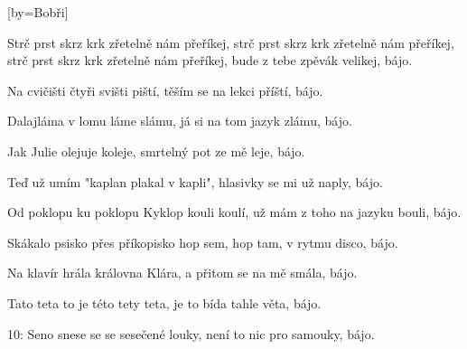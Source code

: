 [by={Bobři}]

\beginchorus{}
Strč prst skrz krk zřetelně nám přeříkej,
strč prst skrz krk zřetelně nám přeříkej,
strč prst skrz krk zřetelně nám přeříkej,
bude z tebe zpěvák velikej, bájo.
\endchorus{}

\beginverse{}
Na cvičišti čtyři svišti piští,
těším se na lekci příští, bájo.
\endverse{}

\beginverse{}
Dalajláma v lomu láme slámu,
já si na tom jazyk zlámu, bájo.
\endverse{}

\beginverse{}
Jak Julie olejuje koleje,
smrtelný pot ze mě leje, bájo.
\endverse{}

\beginverse{}
Teď už umím "kaplan plakal v kapli",
hlasivky se mi už naply, bájo.
\endverse{}

\beginverse{}
Od poklopu ku poklopu Kyklop kouli koulí,
už mám z toho na jazyku bouli, bájo.
\endverse{}

\beginverse{}
Skákalo psisko přes příkopisko
hop sem, hop tam, v rytmu disco, bájo.
\endverse{}

\beginverse{}
Na klavír hrála královna Klára,
a přitom se na mě smála, bájo.
\endverse{}

\beginverse{}
Tato teta to je této tety teta,
je to bída tahle věta, bájo.
\endverse{}

\beginverse{}
10: Seno snese se se sesečené louky,
není to nic pro samouky, bájo.
\endverse{}

\endsong{}

